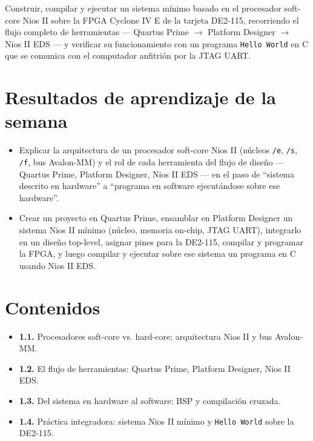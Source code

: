 \documentclass[11pt,letterpaper]{article}
\begin{document}
Construir, compilar y ejecutar un sistema mínimo basado en el procesador soft-core Nios II sobre la
FPGA Cyclone IV E de la tarjeta DE2-115, recorriendo el flujo completo de herramientas ---
Quartus Prime $\to$ Platform Designer $\to$ Nios II EDS --- y verificar su funcionamiento con un
programa \texttt{Hello World} en C que se comunica con el computador anfitrión por la JTAG UART.

\section{Resultados de aprendizaje de la semana}

\begin{itemize}[leftmargin=1.2cm]
  \item[\textbf{RA1.1.}] Explicar la arquitectura de un procesador soft-core Nios II (núcleos
        \texttt{/e}, \texttt{/s}, \texttt{/f}, bus Avalon-MM) y el rol de cada herramienta del
        flujo de diseño --- Quartus Prime, Platform Designer, Nios II EDS --- en el paso de
        ``sistema descrito en hardware'' a ``programa en software ejecutándose sobre ese
        hardware''.
  \item[\textbf{RA1.2.}] Crear un proyecto en Quartus Prime, ensamblar en Platform Designer un
        sistema Nios II mínimo (núcleo, memoria on-chip, JTAG UART), integrarlo en un diseño
        top-level, asignar pines para la DE2-115, compilar y programar la FPGA, y luego compilar y
        ejecutar sobre ese sistema un programa en C usando Nios II EDS.
\end{itemize}

\section{Contenidos}

\begin{itemize}[leftmargin=1.2cm]
  \item \textbf{1.1.} Procesadores soft-core vs. hard-core; arquitectura Nios II y bus Avalon-MM.
  \item \textbf{1.2.} El flujo de herramientas: Quartus Prime, Platform Designer, Nios II EDS.
  \item \textbf{1.3.} Del sistema en hardware al software: BSP y compilación cruzada.
  \item \textbf{1.4.} Práctica integradora: sistema Nios II mínimo y \texttt{Hello World} sobre la
        DE2-115.
\end{itemize}
\end{document}
